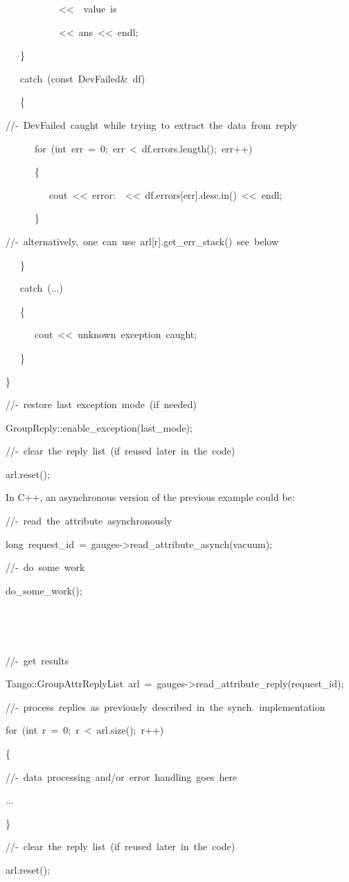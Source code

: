 \begin{lyxcode}
~~~~~~~~~~~<\textcompwordmark{}<~\textquotedbl{}~value~is~\textquotedbl{}

~~~~~~~~~~~<\textcompwordmark{}<~ans~<\textcompwordmark{}<~endl;

~~~\}

~~~catch~(const~DevFailed\&~df)

~~~\{

//-~DevFailed~caught~while~trying~to~extract~the~data~from~reply

~~~~~~for~(int~err~=~0;~err~<~df.errors.length();~err++)

~~~~~~\{

~~~~~~~~~cout~<\textcompwordmark{}<~\textquotedbl{}error:~\textquotedbl{}~<\textcompwordmark{}<~df.errors{[}err{]}.desc.in()~<\textcompwordmark{}<~endl;

~~~~~~\}

//-~alternatively,~one~can~use~arl{[}r{]}.get\_err\_stack()~see~below

~~~\}

~~~catch~(...)

~~~\{

~~~~~~cout~<\textcompwordmark{}<~\textquotedbl{}unknown~exception~caught\textquotedbl{};

~~~\}

\}

//-~restore~last~exception~mode~(if~needed)

GroupReply::enable\_exception(last\_mode);

//-~clear~the~reply~list~(if~reused~later~in~the~code)

arl.reset();
\end{lyxcode}


In C++, an asynchronous version of the previous example could be:


\begin{lyxcode}
//-~read~the~attribute~asynchronously

long~request\_id~=~gauges->read\_attribute\_asynch(\textquotedbl{}vacuum\textquotedbl{});

//-~do~some~work

do\_some\_work();

~

~

//-~get~results

Tango::GroupAttrReplyList~arl~=~gauges->read\_attribute\_reply(request\_id);

//-~process~replies~as~previously~described~in~the~synch.~implementation

for~(int~r~=~0;~r~<~arl.size();~r++)

\{

//-~data~processing~and/or~error~handling~goes~here

...

\}

//-~clear~the~reply~list~(if~reused~later~in~the~code)

arl.reset();
\end{lyxcode}



